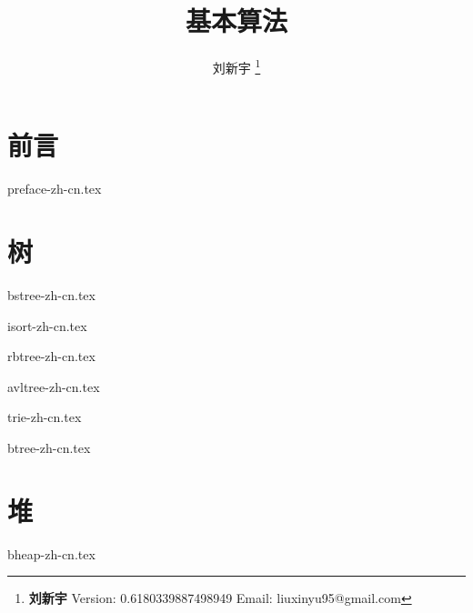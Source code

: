 \documentclass[zihao=5, b5paper, twoside, heading=true]{ctexbook}
\begin{document}


\title{
  {\bf \Huge 基本算法}
  \centering
}

\author{刘新宇
  \thanks{{\bfseries 刘新宇} \newline
    Version: 0.6180339887498949 \newline
    Email: liuxinyu95@gmail.com \newline
    }}

\maketitle


\tableofcontents
\newpage

\part{前言}
{preface-zh-cn.tex}

\part{树}
{bstree-zh-cn.tex}

{isort-zh-cn.tex}

{rbtree-zh-cn.tex}

{avltree-zh-cn.tex}

{trie-zh-cn.tex}

{btree-zh-cn.tex}


\part{堆}
{bheap-zh-cn.tex}
\end{document}

